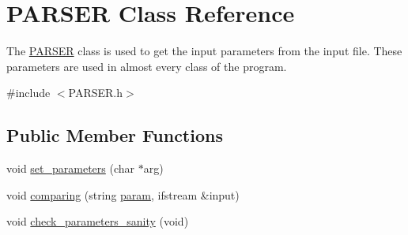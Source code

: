 \hypertarget{classPARSER}{
\section{PARSER Class Reference}
\label{classPARSER}
}


The \hyperlink{classPARSER}{PARSER} class is used to get the input parameters from the input file. These parameters are used in almost every class of the program.  


{\ttfamily \#include $<$PARSER.h$>$}\subsection*{Public Member Functions}
\begin{DoxyCompactItemize}
\item 
void \hyperlink{classPARSER_a4153cc523f4a054e7c488c4fe25b9fa1}{set\_\-parameters} (char $\ast$arg)
\item 
void \hyperlink{classPARSER_aa33f0f4b7870aa1f5e9bf9e67bc648fa}{comparing} (string \hyperlink{classPARSER_af6b8374a3bf76136231ab9616238b610}{param}, ifstream \&input)
\item 
void \hyperlink{classPARSER_a3ae5ce3223fefb960976fe4bbe9083f5}{check\_\-parameters\_\-sanity} (void)
\end{DoxyCompactItemize}
